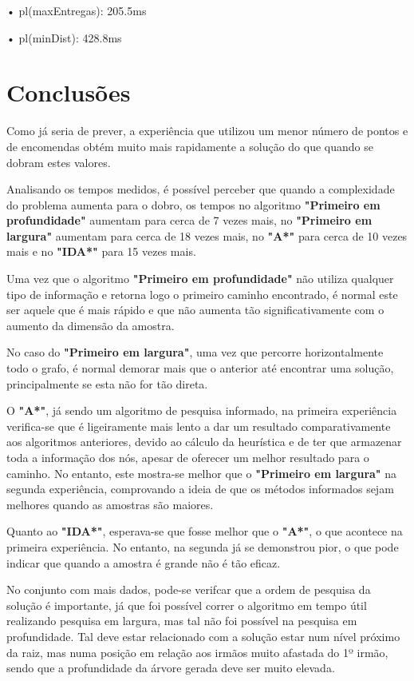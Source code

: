 \documentclass[a4paper]{article}
\begin{document}
	• pl(maxEntregas): 205.5ms

	• pl(minDist): 428.8ms

\newpage

\section{Conclusões}

Como já seria de prever, a experiência que utilizou um menor número de pontos e de encomendas obtém muito mais rapidamente a solução do que quando se dobram estes valores. 

Analisando os tempos medidos, é possível perceber que quando a complexidade do problema aumenta para o dobro, os tempos no algoritmo \textbf{"Primeiro em profundidade"} aumentam para cerca de 7 vezes mais, no \textbf{"Primeiro em largura"} aumentam para cerca de 18 vezes mais, no \textbf{"A*"} para cerca de 10 vezes mais e no \textbf{"IDA*"} para 15 vezes mais.

Uma vez que o algoritmo \textbf{"Primeiro em profundidade"} não utiliza qualquer tipo de informação e retorna logo o primeiro caminho encontrado, é normal este ser aquele que é mais rápido e que não aumenta tão significativamente com o aumento da dimensão da amostra.

No caso do \textbf{"Primeiro em largura"}, uma vez que percorre horizontalmente todo o grafo, é normal demorar mais que o anterior até encontrar uma solução, principalmente se esta não for tão direta.

O \textbf{"A*"}, já sendo um algoritmo de pesquisa informado, na primeira experiência verifica-se que é ligeiramente mais lento a dar um resultado comparativamente aos algoritmos anteriores, devido ao cálculo da heurística e de ter que armazenar toda a informação dos nós, apesar de oferecer um melhor resultado para o caminho. No entanto, este mostra-se melhor que o \textbf{"Primeiro em largura"} na segunda experiência, comprovando a ideia de que os métodos informados sejam melhores quando as amostras são maiores.

Quanto ao \textbf{"IDA*"}, esperava-se que fosse melhor que o \textbf{"A*"}, o que acontece na primeira experiência. No entanto, na segunda já se demonstrou pior, o que pode indicar que quando a amostra é grande não é tão eficaz.

No conjunto com mais dados, pode-se verifcar que a ordem de pesquisa da solução é importante, já que foi possível correr o algoritmo em tempo útil realizando pesquisa em largura, mas tal não foi possível na pesquisa em profundidade. Tal deve estar relacionado com a solução estar num nível próximo da raiz, mas numa posição em relação aos irmãos muito afastada do 1º irmão, sendo que a profundidade da árvore gerada deve ser muito elevada.
\end{document}
